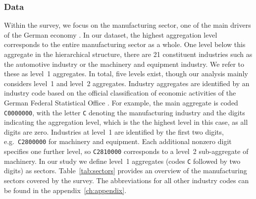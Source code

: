 \subsubsection{Data}
Within the survey, we focus on the manufacturing sector, one of the main drivers of the German economy \citep{sauer2023handbook}. In our dataset, the highest aggregation level corresponds to the entire manufacturing sector as a whole. One level below this aggregate in the hierarchical structure, there are 21 constituent industries such as the automotive industry or the machinery and equipment industry. We refer to these as level~1 aggregates. In total, five levels exist, though our analysis mainly considers level~1 and level~2 aggregates. Industry aggregates are identified by an industry code based on the official classification of economic activities of the German Federal Statistical Office \citep{sauer2023handbook}. For example, the main aggregate is coded \texttt{C0000000}, with the letter \texttt{C} denoting the manufacturing industry and the digits indicating the aggregation level, which is the the highest level in this case, as all digits are zero. Industries at level~1 are identified by the first two digits, e.g.\ \texttt{C2800000} for machinery and equipment. Each additional nonzero digit specifies one further level, so \texttt{C2810000} corresponds to a level~2 sub-aggregate of machinery. In our study we define level~1 aggregates (codes \texttt{C} followed by two digits) as sectors. Table~\ref{tab:sectors} provides an overview of the manufacturing sectors covered by the survey. The abbreviations for all other industry codes can be found in the appendix~\ref{ch:appendix}.

